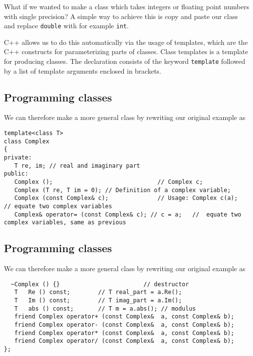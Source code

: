 \documentclass[%
oneside,                 %
final,                   %
10pt]{article}
\begin{document}
What if we wanted to make a class which takes integers
or floating point numbers with single precision?
A simple way to achieve this is copy and paste our class and replace \Verb!double! with for
example \Verb!int!.

C++  allows us to do this automatically via the usage of templates, which
are the C++ constructs for parameterizing parts of
classes. Class templates  is a template for producing classes. The declaration consists
of the keyword \Verb!template! followed by a list of template arguments enclosed in brackets.

\subsection*{Programming classes}

We can therefore make a more general class by rewriting our original example as

\begin{verbatim}
template<class T>
class Complex
{
private:
   T re, im; // real and imaginary part
public:
   Complex ();                              // Complex c;
   Complex (T re, T im = 0); // Definition of a complex variable;
   Complex (const Complex& c);              // Usage: Complex c(a);   // equate two complex variables
   Complex& operator= (const Complex& c); // c = a;   //  equate two complex variables, same as previous

\end{verbatim}

\subsection*{Programming classes}

We can therefore make a more general class by rewriting our original example as

\begin{verbatim}
  ~Complex () {}                        // destructor
   T   Re () const;        // T real_part = a.Re();
   T   Im () const;        // T imag_part = a.Im();
   T   abs () const;       // T m = a.abs(); // modulus
   friend Complex operator+ (const Complex&  a, const Complex& b);
   friend Complex operator- (const Complex&  a, const Complex& b);
   friend Complex operator* (const Complex&  a, const Complex& b);
   friend Complex operator/ (const Complex&  a, const Complex& b);
};
\end{verbatim}
\end{document}

